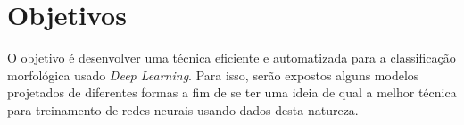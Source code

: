 \section{Objetivos}

O objetivo é desenvolver uma técnica eficiente e automatizada para a  classificação morfológica usado \emph{Deep Learning}. Para isso, serão expostos alguns modelos projetados de diferentes formas a fim de se ter uma ideia de qual a melhor técnica para treinamento de redes neurais usando dados desta natureza.

